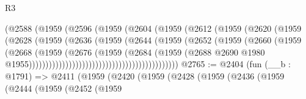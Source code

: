 \begin{lexlean}{R3}
\begin{coremodule}
                                        (@2588
                                          (@1959
                                            (@2596
                                              (@1959
                                                (@2604
                                                  (@1959
                                                    (@2612
                                                      (@1959
                                                        (@2620
                                                          (@1959
                                                            (@2628
                                                              (@1959
                                                                (@2636
                                                                  (@1959
                                                                    (@2644
                                                                      (@1959
                                                                        (@2652
                                                                          (@1959
                                                                            (@2660
                                                                              (@1959
                                                                                (@2668
                                                                                  (@1959
                                                                                    (@2676
                                                                                      (@1959
                                                                                        (@2684
                                                                                          (@1959
                                                                                            (@2688
                                                                                              @2690
                                                                                              @1980
                                                                                              @1955)))))))))))))))))))))))))))))))))))))))))))))
@2765 := @2404
    (fun (__b : @1791) =>
    @2411
      (@1959
        (@2420
          (@1959
            (@2428
              (@1959
                (@2436
                  (@1959
                    (@2444
                      (@1959
                        (@2452
                          (@1959

\end{coremodule}
\end{lexlean}
